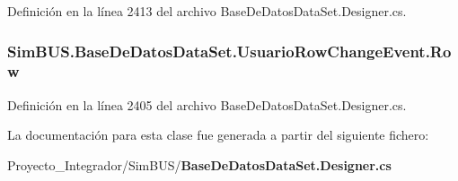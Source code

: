 Definición en la línea 2413 del archivo Base\-De\-Datos\-Data\-Set.\-Designer.\-cs.

\subsubsection[{Row}]{ Sim\-B\-U\-S.\-Base\-De\-Datos\-Data\-Set.\-Usuario\-Row\-Change\-Event.\-Row\hspace{0.3cm}{\ttfamily [get]}}\label{class_sim_b_u_s_1_1_base_de_datos_data_set_1_1_usuario_row_change_event_abe7e5fecd2ef4e7ca37978f98ab3f424}


Definición en la línea 2405 del archivo Base\-De\-Datos\-Data\-Set.\-Designer.\-cs.



La documentación para esta clase fue generada a partir del siguiente fichero\-:\begin{DoxyCompactItemize}
\item 
Proyecto\-\_\-\-Integrador/\-Sim\-B\-U\-S/{\bf Base\-De\-Datos\-Data\-Set.\-Designer.\-cs}\end{DoxyCompactItemize}
